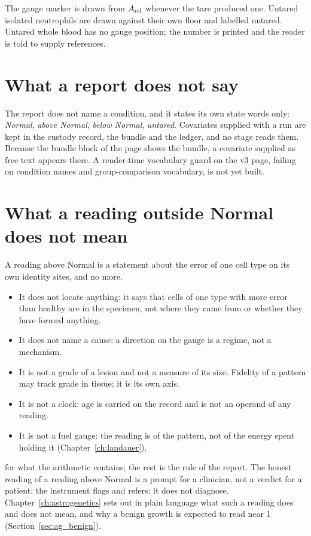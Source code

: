 The gauge marker is drawn from $A_{\rm rel}$ whenever the tare produced one. Untared isolated neutrophils are drawn against their own floor and labelled untared.
Untared whole blood has no gauge position; the number is printed and the reader is told to supply references.



\section{What a report does not say}

The report does not name a condition, and it states its own state words only: \emph{Normal}, \emph{above Normal}, \emph{below Normal}, \emph{untared}. Covariates
supplied with a run are kept in the custody record, the bundle and the ledger, and no stage reads them. Because the bundle block of the
page shows the bundle, a covariate supplied as free text appears there. A render-time vocabulary guard on the v3 page, failing on condition names and group-comparison
vocabulary, is not yet built. \openprob



\section{What a reading outside Normal does not mean}\label{sec:p4notmean}

A reading above Normal is a statement about the error of one cell type on its own identity sites, and no more.
\begin{itemize}
\item It does not locate anything: it says that cells of one type with more error than healthy are in the specimen, not where they came
      from or whether they have formed anything.
\item It does not name a cause: a direction on the gauge is a regime, not a mechanism.
\item It is not a grade of a lesion and not a measure of its size. Fidelity of a pattern may track grade in tissue; it is its own axis.
\item It is not a clock: age is carried on the record and is not an operand of any reading.
\item It is not a fuel gauge: the reading is of the pattern, not of the energy spent holding it (Chapter~\ref{ch:landauer}).
\end{itemize}
\derived{} for what the arithmetic contains; the rest is the rule of the report.
The honest reading of a reading above Normal is a prompt for a clinician, not a verdict for a patient: the instrument flags and refers; it
does not diagnose. Chapter~\ref{ch:astrogenetics} sets out in plain language what such a reading does and does not mean, and why a benign
growth is expected to read near 1 (Section~\ref{sec:ag_benign}).

